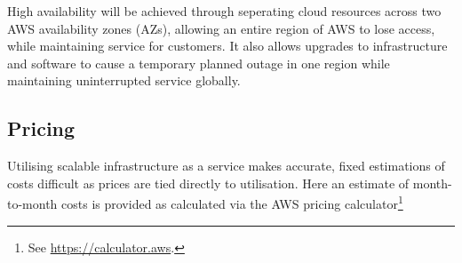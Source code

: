 High availability will be achieved through seperating cloud resources across two AWS availability zones (AZs), allowing an entire region of AWS to lose access, while maintaining service for customers. It also allows upgrades to infrastructure and software to cause a temporary planned outage in one region while maintaining uninterrupted service globally.

\subsection{Pricing}

Utilising scalable infrastructure as a service makes accurate, fixed estimations of costs difficult as prices are tied directly to utilisation. Here an estimate of month-to-month costs is provided as calculated via the AWS pricing calculator\footnote{See \url{https://calculator.aws}.}

